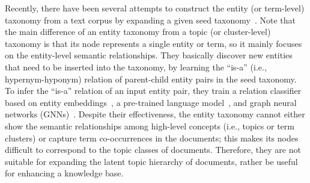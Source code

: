 \label{subsec:taxoexpan}
Recently, there have been several attempts to construct the entity (or term-level) taxonomy from a text corpus by expanding a given seed taxonomy~\cite{shen2017setexpan,shen2018hiexpan,shen2020taxoexpan,huang2020corel,zeng2021enhancing,mao2020octet,yu2020steam}.
Note that the main difference of an entity taxonomy from a topic (or cluster-level) taxonomy is that its node represents a single entity or term, so it mainly focuses on the entity-level semantic relationships.
They basically discover new entities that need to be inserted into the taxonomy, by learning the ``is-a'' (i.e., hypernym-hyponym) relation of parent-child entity pairs in the seed taxonomy.
To infer the ``is-a''  relation of an input entity pair, they train a relation classifier based on entity embeddings~\cite{shen2018hiexpan}, a pre-trained language model~\cite{huang2020corel}, and graph neural networks (GNNs)~\cite{shen2020taxoexpan}.
Despite their effectiveness, the entity taxonomy cannot either show the semantic relationships among high-level concepts (i.e., topics or term clusters) or capture term co-occurrences in the documents; this makes its nodes difficult to correspond to the topic classes of documents. 
Therefore, they are not suitable for expanding the latent topic hierarchy of documents, rather be useful for enhancing a knowledge base.

